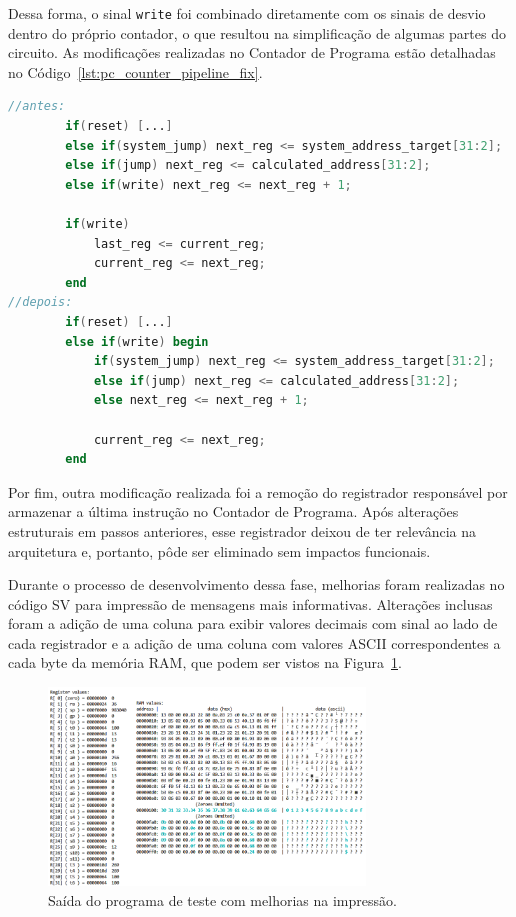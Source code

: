 \documentclass[
	12pt,				%
	openright,			%
	oneside,			%
	a4paper,			%
	english,			%
	french,				%
	spanish,			%
	brazil,				%
	]{abntex2}
\begin{document}
Dessa forma, o sinal \texttt{write} foi combinado diretamente com os sinais de desvio dentro do próprio contador, o que resultou na simplificação de algumas partes do circuito. As modificações realizadas no Contador de Programa estão detalhadas no Código~\ref{lst:pc_counter_pipeline_fix}.

\begin{lstlisting}[language=Verilog, caption={Alterações realizadas no Contador de Programa}, label={lst:pc_counter_pipeline_fix}]
//antes:
        if(reset) [...]
        else if(system_jump) next_reg <= system_address_target[31:2];
        else if(jump) next_reg <= calculated_address[31:2];
        else if(write) next_reg <= next_reg + 1;

        if(write)
            last_reg <= current_reg;
            current_reg <= next_reg;
        end
//depois:
        if(reset) [...]
        else if(write) begin
            if(system_jump) next_reg <= system_address_target[31:2];
            else if(jump) next_reg <= calculated_address[31:2];
            else next_reg <= next_reg + 1;

            current_reg <= next_reg;
        end
\end{lstlisting}

Por fim, outra modificação realizada foi a remoção do registrador responsável por armazenar a última instrução no Contador de Programa. Após alterações estruturais em passos anteriores, esse registrador deixou de ter relevância na arquitetura e, portanto, pôde ser eliminado sem impactos funcionais.

Durante o processo de desenvolvimento dessa fase, melhorias foram realizadas no código SV para impressão de mensagens mais informativas. Alterações inclusas foram a adição de uma coluna para exibir valores decimais com sinal ao lado de cada registrador e a adição de uma coluna com valores ASCII correspondentes a cada byte da memória RAM, que podem ser vistos na Figura~\ref{fig:SV_Print_Upgrade}.

\begin{figure}[h]
    \centering
    \includegraphics[width=0.75\textwidth]{ProcessoDesenvolvimento/Arquitetura/SV_Print_Upgrade.png}
    \caption{Saída do programa de teste com melhorias na impressão.}
    \label{fig:SV_Print_Upgrade}
\end{figure}
\end{document}
